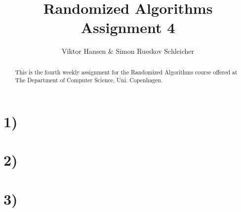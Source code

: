 \documentclass[12pt]{article}
\begin{document}
\nocite{*}


\title{Randomized Algorithms \\
       Assignment 4}

\author{Viktor Hansen \& Simon Rueskov Schleicher}

\maketitle

\begin{abstract}
  This is the fourth weekly assignment for the Randomized Algorithms course offered at The Department of Computer Science, Uni. Copenhagen.
\end{abstract}

\pagebreak

\section*{1)}

\section*{2)}

\section*{3)}
\end{document}
